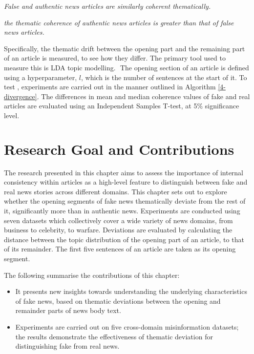 \begin{hyp}
  [Null] \label{hyp:a}\textit{False and authentic news articles are similarly coherent thematically.}
\end{hyp}
\begin{hyp}
  [Alternative] \label{hyp:b}\textit{the thematic coherence of authentic news articles is greater than that of false news articles.}
\end{hyp}

Specifically, the thematic drift between the opening part and the remaining part of an article is measured, to see how they differ. The primary tool used to measure this is \ac{LDA} topic modelling.  The opening section of an article is defined using a hyperparameter, $l$, which is the number of sentences at the start of it. To test , experiments are carried out in the manner outlined in Algorithm \autoref{4-divergence}. The differences in mean and median coherence values of fake and real articles are evaluated using an Independent Samples T-test, at 5\% significance level.

\section{Research Goal and Contributions}
\label{sec:4-goals-contributions}

The research presented in this chapter aims to assess the importance of internal consistency within articles as a high-level feature to distinguish between fake and real news stories across different domains. This chapter sets out to explore whether the opening segments of fake news thematically deviate from the rest of it, significantly more than in authentic news. Experiments are conducted using seven datasets which collectively cover a wide variety of news domains, from business to celebrity, to warfare. Deviations are evaluated by calculating the distance between the topic distribution of the opening part of an article, to that of its remainder. The first five sentences of an article are taken as its opening segment.

The following summarise the contributions of this chapter:

\begin{itemize}
  \item It presents new insights towards understanding the underlying characteristics of fake news, based on thematic deviations between the opening and remainder parts of news body text.
  \item Experiments are carried out on five cross-domain misinformation datasets; the results demonstrate the effectiveness of thematic deviation for distinguishing fake from real news.
\end{itemize}

